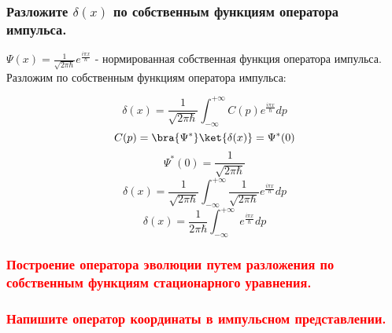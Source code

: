 \subsubsection{Разложите $\delta(x)$  по собственным функциям оператора импульса.}


$\Psi(x)=\frac{1}{\sqrt{2\pi \hbar}}e^{\frac{i\pi x}{\hbar}}$ - нормированная собственная функция оператора импульса. Разложим по собственным функциям оператора импульса:

$$\delta(x) = \frac{1}{\sqrt{2\pi \hbar}}\int_{-\infty}^{+\infty} C(p) e^{\frac{i\pi x}{\hbar}} dp$$
$$C(p)=\bra{\Psi^*} \ket{\delta(x)}=\Psi^*(0)$$
$$\Psi^*(0)=\frac{1}{\sqrt{2\pi \hbar}}$$
$$\delta(x) = \frac{1}{\sqrt{2\pi \hbar}}\int_{-\infty}^{+\infty} \frac{1}{\sqrt{2\pi \hbar}} e^{\frac{i\pi x}{\hbar}} dp$$
$$\delta(x) = \frac{1}{2\pi \hbar}\int_{-\infty}^{+\infty} \ e^{\frac{i\pi x}{\hbar}} dp$$

\subsubsection{\textcolor{red} {Построение оператора эволюции путем разложения по собственным функциям стационарного уравнения.} }

\subsubsection{\textcolor{red} {Напишите оператор координаты в импульсном представлении.} }